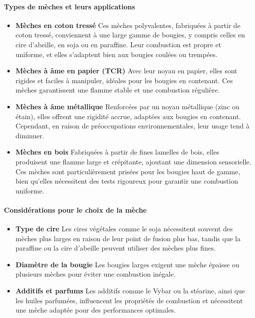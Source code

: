 \documentclass[11pt,fleqn,onecolumn,oneside]{book}
\begin{document}
\paragraph{Types de mèches et leurs applications}

\begin{itemize}
    \item \textbf{Mèches en coton tressé} Ces mèches polyvalentes, fabriquées à partir de coton tressé, conviennent à une large gamme de bougies, y compris celles en cire d’abeille, en soja ou en paraffine. Leur combustion est propre et uniforme, et elles s’adaptent bien aux bougies coulées ou trempées.
    
    \item \textbf{Mèches à âme en papier (TCR)} Avec leur noyau en papier, elles sont rigides et faciles à manipuler, idéales pour les bougies en contenant. Ces mèches garantissent une flamme stable et une combustion régulière.
    
    \item \textbf{Mèches à âme métallique} Renforcées par un noyau métallique (zinc ou étain), elles offrent une rigidité accrue, adaptées aux bougies en contenant. Cependant, en raison de préoccupations environnementales, leur usage tend à diminuer.
    
    \item \textbf{Mèches en bois} Fabriquées à partir de fines lamelles de bois, elles produisent une flamme large et crépitante, ajoutant une dimension sensorielle. Ces mèches sont particulièrement prisées pour les bougies haut de gamme, bien qu’elles nécessitent des tests rigoureux pour garantir une combustion uniforme.
\end{itemize}

\paragraph{Considérations pour le choix de la mèche}

\begin{itemize}
    \item \textbf{Type de cire} Les cires végétales comme le soja nécessitent souvent des mèches plus larges en raison de leur point de fusion plus bas, tandis que la paraffine ou la cire d’abeille peuvent utiliser des mèches plus fines.
    \item \textbf{Diamètre de la bougie} Les bougies larges exigent une mèche épaisse ou plusieurs mèches pour éviter une combustion inégale. 
    \item \textbf{Additifs et parfums} Les additifs comme le Vybar ou la stéarine, ainsi que les huiles parfumées, influencent les propriétés de combustion et nécessitent une mèche adaptée pour des performances optimales.
\end{itemize}
\end{document}
